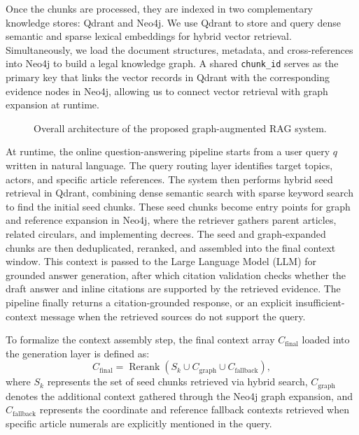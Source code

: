 Once the chunks are processed, they are indexed in two complementary knowledge stores: Qdrant and Neo4j. We use Qdrant to store and query dense semantic and sparse lexical embeddings for hybrid vector retrieval. Simultaneously, we load the document structures, metadata, and cross-references into Neo4j to build a legal knowledge graph. A shared \texttt{chunk\_id} serves as the primary key that links the vector records in Qdrant with the corresponding evidence nodes in Neo4j, allowing us to connect vector retrieval with graph expansion at runtime.

\begin{figure}[t!]
  \centering
  \resizebox{0.95\textwidth}{!}{}
  \caption{Overall architecture of the proposed graph-augmented RAG system.}
  \label{fig:overall-system-architecture}
\end{figure}

At runtime, the online question-answering pipeline starts from a user query $q$ written in natural language. The query routing layer identifies target topics, actors, and specific article references. The system then performs hybrid seed retrieval in Qdrant, combining dense semantic search with sparse keyword search to find the initial seed chunks. These seed chunks become entry points for graph and reference expansion in Neo4j, where the retriever gathers parent articles, related circulars, and implementing decrees. The seed and graph-expanded chunks are then deduplicated, reranked, and assembled into the final context window. This context is passed to the Large Language Model (LLM) for grounded answer generation, after which citation validation checks whether the draft answer and inline citations are supported by the retrieved evidence. The pipeline finally returns a citation-grounded response, or an explicit insufficient-context message when the retrieved sources do not support the query.

To formalize the context assembly step, the final context array $C_{\mathrm{final}}$ loaded into the generation layer is defined as:
\[
C_{\mathrm{final}} =
\operatorname{Rerank}
\left(
S_k \cup C_{\mathrm{graph}} \cup C_{\mathrm{fallback}}
\right),
\]
where $S_k$ represents the set of seed chunks retrieved via hybrid search, $C_{\mathrm{graph}}$ denotes the additional context gathered through the Neo4j graph expansion, and $C_{\mathrm{fallback}}$ represents the coordinate and reference fallback contexts retrieved when specific article numerals are explicitly mentioned in the query.

